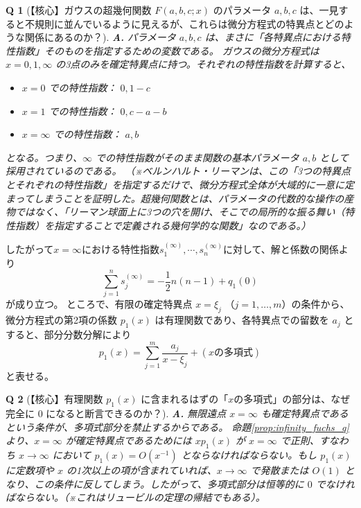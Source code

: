 \documentclass[paper=a4, fontsize=11pt]{jlreq} %
\theoremstyle{break}
\theoremstyle{qa}
\newtheorem*{Q}{Q}
\theoremstyle{remark} %
\begin{document}
\begin{Q}[【核心】ガウスの超幾何関数 $F(a,b,c; x)$ のパラメータ $a, b, c$ は、一見すると不規則に並んでいるように見えるが、これらは微分方程式の特異点とどのような関係にあるのか？]
\textbf{A.} パラメータ $a, b, c$ は、まさに「各特異点における特性指数」そのものを指定するための変数である。
ガウスの微分方程式は $x=0, 1, \infty$ の3点のみを確定特異点に持つ。それぞれの特性指数を計算すると、
\begin{itemize}
    \item $x=0$ での特性指数： $0, 1-c$
    \item $x=1$ での特性指数： $0, c-a-b$
    \item $x=\infty$ での特性指数： $a, b$
\end{itemize}
となる。つまり、$\infty$ での特性指数がそのまま関数の基本パラメータ $a, b$ として採用されているのである。
（※ベルンハルト・リーマンは、この「3つの特異点とそれぞれの特性指数」を指定するだけで、微分方程式全体が大域的に一意に定まってしまうことを証明した。超幾何関数とは、パラメータの代数的な操作の産物ではなく、「リーマン球面上に3つの穴を開け、そこでの局所的な振る舞い（特性指数）を指定することで定義される幾何学的な関数」なのである。）
\end{Q}
したがって$x=\infty$における特性指数$s_{1}^{(\infty)},\cdots,s_{n}^{(\infty)}$に対して、解と係数の関係より
\begin{equation}\label{eq:sum-of-infinity-exponents}
\sum_{j=1}^{n} s_{j}^{(\infty)} = -\frac{1}{2}n(n-1) + q_{1}(0)
\end{equation}
が成り立つ。
ところで、有限の確定特異点 $x=\xi_{j}$ （$j=1, \dots, m$）の条件から、微分方程式の第2項の係数 $p_{1}(x)$ は有理関数であり、各特異点での留数を $a_{j}$ とすると、部分分数分解により
\[
p_{1}(x) = \sum_{j=1}^{m} \frac{a_{j}}{x-\xi_{j}} + (x\text{の多項式})
\]
と表せる。

\begin{Q}[【核心】有理関数 $p_{1}(x)$ に含まれるはずの「$x$の多項式」の部分は、なぜ完全に $0$ になると断言できるのか？]
\textbf{A.} 無限遠点 $x=\infty$ も確定特異点であるという条件が、多項式部分を禁止するからである。
命題\ref{prop:infinity_fuchs_q}より、$x=\infty$ が確定特異点であるためには $x p_{1}(x)$ が $x=\infty$ で正則、すなわち $x \to \infty$ において $p_{1}(x) = O(x^{-1})$ とならなければならない。もし $p_{1}(x)$ に定数項や $x$ の1次以上の項が含まれていれば、$x \to \infty$ で発散または $O(1)$ となり、この条件に反してしまう。したがって、多項式部分は恒等的に $0$ でなければならない。（※これはリュービルの定理の帰結でもある）。
\end{Q}
\end{document}
